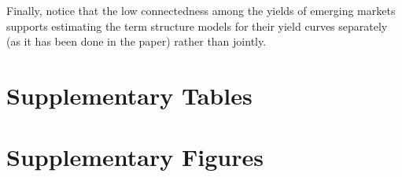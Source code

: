 \begin{appendices}

Finally, notice that the low connectedness among the yields of emerging markets supports estimating the term structure models for their yield curves separately (as it has been done in the paper) rather than jointly.


\renewcommand{\thetable}{\thesection.\arabic{table}}
\renewcommand\thefigure{\thesection.\arabic{figure}}
\section{Supplementary Tables} \label{sec:AppTables}
\setcounter{table}{0}


\section{Supplementary Figures} \label{sec:AppFigures}
\setcounter{figure}{0}

\begin{landscape}
	
	
\end{landscape}





\begin{landscape}
	\newpage
\end{landscape}

\end{appendices}